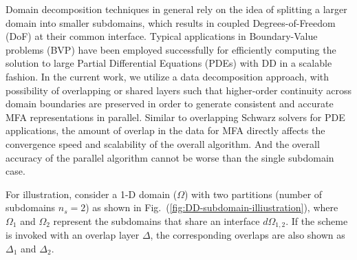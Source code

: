 \documentclass[conference]{IEEEtran}
\newcommand{\fig}[1]{Fig.~(\ref{#1})}
\begin{document}
Domain decomposition techniques in general rely on the idea of splitting a larger domain into smaller subdomains, which results in coupled Degrees-of-Freedom (DoF) at their common interface. Typical applications in Boundary-Value problems (BVP) \cite{smith-ddm, lions-asm} have been employed successfully for efficiently computing the solution to large Partial Differential Equations (PDEs) with DD in a scalable fashion. In the current work, we utilize a data decomposition approach, with possibility of overlapping or shared layers such that higher-order continuity across domain boundaries are preserved in order to generate consistent and accurate MFA representations in parallel. Similar to overlapping Schwarz solvers for PDE applications, the amount of overlap in the data for MFA directly affects the convergence speed and scalability of the overall algorithm. And the overall accuracy of the parallel algorithm cannot be worse than the single subdomain case.

For illustration, consider a 1-D domain ($\Omega$) with two partitions (number of subdomains $n_s=2$) as shown in \fig{fig:DD-subdomain-illiustration}, where $\Omega_1$ and $\Omega_2$ represent the subdomains that share an interface $d\Omega_{1,2}$. If the scheme is invoked with an overlap layer $\Delta$, the corresponding overlaps are also shown as $\Delta_1$ and $\Delta_2$.

\end{document}
